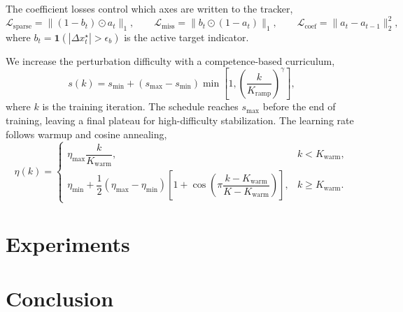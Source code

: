 \documentclass{article}
\begin{document}
	The coefficient losses control which axes are written to the tracker,
	\begin{equation}
	\label{eq:coefficient-loss}
	\mathcal{L}_{\mathrm{sparse}}
	=
	\|(1-b_t)\odot a_t\|_1,
	\qquad
	\mathcal{L}_{\mathrm{miss}}
	=
	\|b_t\odot(1-a_t)\|_1,
	\qquad
	\mathcal{L}_{\mathrm{coef}}
	=
	\|a_t-a_{t-1}\|_2^2 ,
	\end{equation}
	where $b_t=\mathbf{1}(|\Delta x_t^\star|>\epsilon_b)$ is the active target indicator.

	We increase the perturbation difficulty with a competence-based curriculum,
	\begin{equation}
	\label{eq:perturbation-curriculum}
	s(k)
	=
	s_{\min}
	+
	(s_{\max}-s_{\min})
	\min
	\left[
	1,
	\left(
	\frac{k}{K_{\mathrm{ramp}}}
	\right)^\gamma
	\right],
	\end{equation}
	where $k$ is the training iteration. The schedule reaches $s_{\max}$ before the end of training, leaving a final plateau for high-difficulty stabilization. The learning rate follows warmup and cosine annealing,
	\begin{equation}
	\label{eq:cosine-lr}
	\eta(k)
	=
	\begin{cases}
	\eta_{\max}\dfrac{k}{K_{\mathrm{warm}}}, & k<K_{\mathrm{warm}},\\[6pt]
	\eta_{\min}
	+
	\dfrac{1}{2}(\eta_{\max}-\eta_{\min})
	\left[
	1+\cos
	\left(
	\pi
	\dfrac{k-K_{\mathrm{warm}}}{K-K_{\mathrm{warm}}}
	\right)
	\right], & k\ge K_{\mathrm{warm}} .
	\end{cases}
	\end{equation}
		

\section{Experiments}
\label{sec:result}

	


\section{Conclusion}
\label{sec:conclusion}

	


\clearpage


\end{document}
